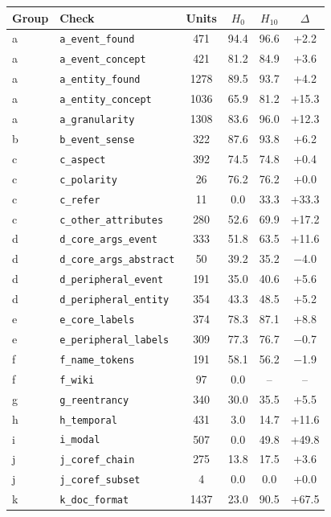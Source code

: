 \begin{tabular}{@{}llcccc@{}}
\toprule
Group & Check & Units & $H_0$ & $H_{10}$ & $\Delta$ \\
\midrule
a & \texttt{a\_event\_found} & 471 & 94.4 & 96.6 & +2.2 \\
a & \texttt{a\_event\_concept} & 421 & 81.2 & 84.9 & +3.6 \\
a & \texttt{a\_entity\_found} & 1278 & 89.5 & 93.7 & +4.2 \\
a & \texttt{a\_entity\_concept} & 1036 & 65.9 & 81.2 & +15.3 \\
a & \texttt{a\_granularity} & 1308 & 83.6 & 96.0 & +12.3 \\
b & \texttt{b\_event\_sense} & 322 & 87.6 & 93.8 & +6.2 \\
c & \texttt{c\_aspect} & 392 & 74.5 & 74.8 & +0.4 \\
c & \texttt{c\_polarity} & 26 & 76.2 & 76.2 & +0.0 \\
c & \texttt{c\_refer} & 11 & 0.0 & 33.3 & +33.3 \\
c & \texttt{c\_other\_attributes} & 280 & 52.6 & 69.9 & +17.2 \\
d & \texttt{d\_core\_args\_event} & 333 & 51.8 & 63.5 & +11.6 \\
d & \texttt{d\_core\_args\_abstract} & 50 & 39.2 & 35.2 & $-$4.0 \\
d & \texttt{d\_peripheral\_event} & 191 & 35.0 & 40.6 & +5.6 \\
d & \texttt{d\_peripheral\_entity} & 354 & 43.3 & 48.5 & +5.2 \\
e & \texttt{e\_core\_labels} & 374 & 78.3 & 87.1 & +8.8 \\
e & \texttt{e\_peripheral\_labels} & 309 & 77.3 & 76.7 & $-$0.7 \\
f & \texttt{f\_name\_tokens} & 191 & 58.1 & 56.2 & $-$1.9 \\
f & \texttt{f\_wiki} & 97 & 0.0 & -- & -- \\
g & \texttt{g\_reentrancy} & 340 & 30.0 & 35.5 & +5.5 \\
h & \texttt{h\_temporal} & 431 & 3.0 & 14.7 & +11.6 \\
i & \texttt{i\_modal} & 507 & 0.0 & 49.8 & +49.8 \\
j & \texttt{j\_coref\_chain} & 275 & 13.8 & 17.5 & +3.6 \\
j & \texttt{j\_coref\_subset} & 4 & 0.0 & 0.0 & +0.0 \\
k & \texttt{k\_doc\_format} & 1437 & 23.0 & 90.5 & +67.5 \\
\bottomrule
\end{tabular}
